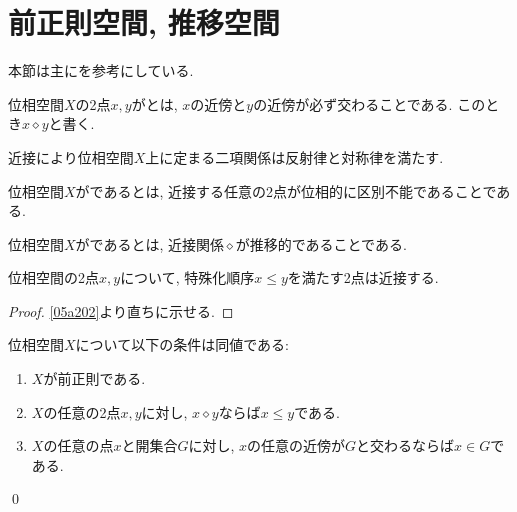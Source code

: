 \documentclass[uplatex, dvipdfmx, a4paper, 12pt, class=jsbook, crop=false]{standalone}
\begin{document}
\section{前正則空間, 推移空間}
\label{sec:preregular-spaces}

\newcommand{\topleq}{\leq}
\newcommand{\topnear}{\mathrel{\diamond}}

\begin{source}
	本節は主に\cite[Chapter 16]{Schechter1997HAF}を参考にしている.
\end{source}

\begin{definition}
	位相空間\(X\)の2点\(x, y\)がとは,
	\(x\)の近傍と\(y\)の近傍が必ず交わることである.
	このとき\(x \topnear y\)と書く.
\end{definition}

近接により位相空間\(X\)上に定まる二項関係は反射律と対称律を満たす.

\begin{definition}
	位相空間\(X\)がであるとは,
	近接する任意の2点が位相的に区別不能であることである.
\end{definition}

\begin{definition}
	位相空間\(X\)がであるとは,
	近接関係\(\topnear\)が推移的であることである.
\end{definition}

\begin{proposition}
	位相空間の2点\(x, y\)について, 特殊化順序\(x \topleq y\)を満たす2点は近接する.
\end{proposition}

\begin{proof}
	\cref{05a202}より直ちに示せる.
\end{proof}

\begin{proposition}
	\label{ae23aa}
	位相空間\(X\)について以下の条件は同値である:
	\begin{enumerate}
		\item \(X\)が前正則である.
		\item \(X\)の任意の2点\(x, y\)に対し, \(x \topnear y\)ならば\(x \topleq y\)である.
		\item \(X\)の任意の点\(x\)と開集合\(G\)に対し, \(x\)の任意の近傍が\(G\)と交わるならば\(x \in G\)である.
	\end{enumerate}
	\qed
\end{proposition}
\end{document}
